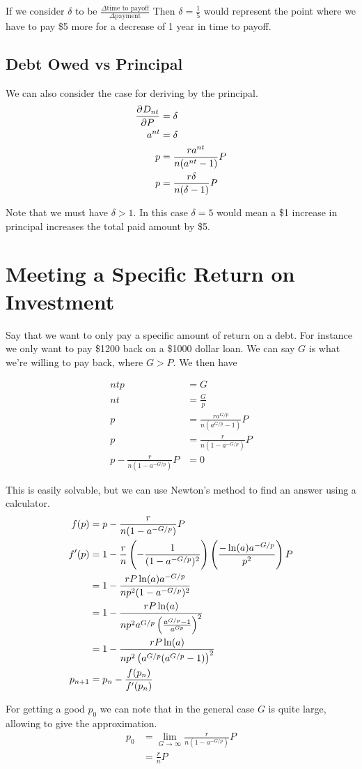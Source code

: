 \documentclass[12pt]{article}
\begin{document}
If we consider $\delta$ to be
$\frac{\Delta\text{time to payoff}}{\Delta\text{payment}}$
Then $\delta = \frac{1}{5}$ would represent the point where we have to pay \$5
more for a decrease of 1 year in time to payoff.


\subsection{Debt Owed vs Principal}

We can also consider the case for deriving by the principal.
\begin{align*}
    \dpd{D_{nt}}{P} &= \delta\\
    a^{nt} &= \delta\\
    p &= \frac{r a^{nt}}{n (a^{nt} - 1)} P\\
    p &= \frac{r \delta}{n (\delta - 1)} P
\end{align*}

Note that we must have $\delta > 1$.
In this case $\delta = 5$ would mean a \$1 increase in principal increases the
total paid amount by \$5.


\section{Meeting a Specific Return on Investment}

Say that we want to only pay a specific amount of return on a debt.
For instance we only want to pay \$1200 back on a \$1000 dollar loan.
We can say $G$ is what we're willing to pay back, where $G > P$.
We then have

\begin{align*}
    ntp &= G\\
    nt &= \frac{G}{p}\\
    p &= \frac{r a^{G/p}}{n (a^{G/p} - 1)} P\\
    p &= \frac{r}{n (1 - a^{-G/p})} P\\
    p - \frac{r}{n (1 - a^{-G/p})} P &= 0
\end{align*}

This is easily solvable, but we can use Newton's method to find an answer using
a calculator.
\begin{align*}
    f(p) &= p - \frac{r}{n (1 - a^{-G/p})} P\\
    f'(p) &= 1 - \frac{r}{n} \del{-\frac{1}{(1 - a^{-G/p})^2}} \del{\frac{-\ln(a) a^{-G/p}}{p^2}} P\\
               &= 1 - \frac{rP \ln(a) a^{-G/p}}{np^2 (1 - a^{-G/p})^2}\\
               &= 1 - \frac{rP \ln(a)}{np^2 a^{G/p} \del{\frac{a^{G/p} - 1}{a^{Gp}}}^2}\\
               &= 1 - \frac{rP \ln(a)}{np^2 \del{a^{G/p} (a^{G/p} - 1)}^2}\\
    p_{n + 1} &= p_n - \frac{f(p_n)}{f'(p_n)}
\end{align*}

For getting a good $p_0$ we can note that in the general case $G$ is quite
large, allowing to give the approximation.
\begin{align*}
    p_0 &= \lim_{G \to \infty} \frac{r}{n (1 - a^{-G/p})} P\\
        &= \frac{r}{n} P
\end{align*}
\end{document}
